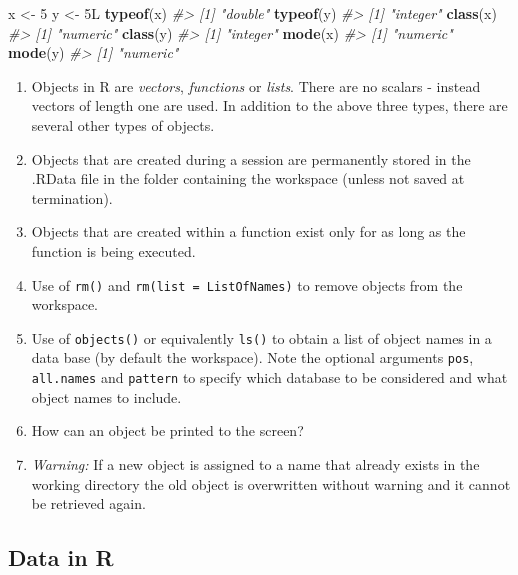 \documentclass[
]{book}
\newenvironment{Shaded}{\begin{snugshade}}{\end{snugshade}}
\newcommand{\CommentTok}[1]{\textcolor[rgb]{0.56,0.35,0.01}{\textit{#1}}}
\newcommand{\DataTypeTok}[1]{\textcolor[rgb]{0.13,0.29,0.53}{#1}}
\newcommand{\DecValTok}[1]{\textcolor[rgb]{0.00,0.00,0.81}{#1}}
\newcommand{\FunctionTok}[1]{\textcolor[rgb]{0.13,0.29,0.53}{\textbf{#1}}}
\newcommand{\NormalTok}[1]{#1}
\newcommand{\OtherTok}[1]{\textcolor[rgb]{0.56,0.35,0.01}{#1}}
\begin{document}
\begin{Shaded}
\begin{Highlighting}[]
\NormalTok{x }\OtherTok{\textless{}{-}} \DecValTok{5}
\NormalTok{y }\OtherTok{\textless{}{-}} \DecValTok{5}\DataTypeTok{L}
\FunctionTok{typeof}\NormalTok{(x)}
\CommentTok{\#\textgreater{} [1] "double"}
\FunctionTok{typeof}\NormalTok{(y)}
\CommentTok{\#\textgreater{} [1] "integer"}
\FunctionTok{class}\NormalTok{(x)}
\CommentTok{\#\textgreater{} [1] "numeric"}
\FunctionTok{class}\NormalTok{(y)}
\CommentTok{\#\textgreater{} [1] "integer"}
\FunctionTok{mode}\NormalTok{(x)}
\CommentTok{\#\textgreater{} [1] "numeric"}
\FunctionTok{mode}\NormalTok{(y)}
\CommentTok{\#\textgreater{} [1] "numeric"}
\end{Highlighting}
\end{Shaded}

\begin{enumerate}
\def\labelenumi{(\alph{enumi})}
\setcounter{enumi}{5}
\item
  Objects in R are \emph{{vectors}}, \emph{{functions}} or \emph{{lists}}. There are no scalars - instead vectors of length one are used. In addition to the above three types, there are several other types of objects.
\item
  Objects that are created during a session are permanently stored in the {.RData} file in the folder containing the workspace (unless not saved at termination).
\item
  Objects that are created within a function exist only for as long as the function is being executed.
\item
  Use of \texttt{rm()} and \texttt{rm(list\ =\ ListOfNames)} to remove objects from the workspace.
\item
  Use of \texttt{objects()} or equivalently \texttt{ls()} to obtain a list of object names in a data base (by default the workspace). Note the optional arguments \texttt{pos}, \texttt{all.names} and \texttt{pattern} to specify which database to be considered and what object names to include.
\item
  How can an object be printed to the screen?
\item
  \emph{{Warning:}} If a new object is assigned to a name that already exists in the working directory the old object is overwritten without warning and it cannot be retrieved again.
\end{enumerate}

\subsection{Data in R}\label{data-in-r}
\end{document}
